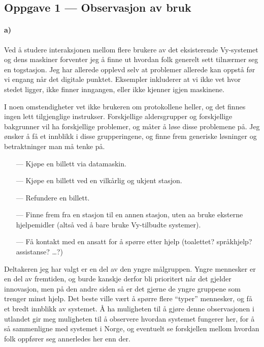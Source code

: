 \documentclass{../../myassignment}
\begin{document}
	\subsection*{Oppgave 1 --- Observasjon av bruk}
	\paragraph*{a)}

		Ved {\aa} studere interaksjonen mellom flere brukere av det eksisterende Vy-systemet og dens maskiner forventer jeg {\aa} finne ut hvordan folk generelt sett tiln{\ae}rmer seg en togstasjon. Jeg har allerede opplevd selv at problemer allerede kan oppst{\aa} f{\o}r vi engang n{\aa}r det digitale punktet. Eksempler inkluderer at vi ikke vet hvor stedet ligger, ikke finner inngangen, eller ikke kjenner igjen maskinene. 

		I noen omstendigheter vet ikke brukeren om protokollene heller, og det finnes ingen lett tilgjenglige instrukser. Forskjellige aldersgrupper og forskjellige bakgrunner vil ha forskjellige problemer, og m{\aa}ter {\aa} l{\o}se disse problemene p{\aa}. Jeg {\o}nsker {\aa} f{\aa} et innblikk i disse grupperingene, og finne frem generiske l{\o}sninger og betraktninger man m{\aa} tenke p{\aa}.

		\begin{itemize}
		\item[---] Kj{\o}pe en billett via datamaskin. 
		\item[---] Kj{\o}pe en billett ved en vilk{\aa}rlig og ukjent stasjon. 
		\item[---] Refundere en billett.
		\item[---] Finne frem fra en stasjon til en annen stasjon, uten aa bruke eksterne hjelpemidler (alts{\aa} ved {\aa} bare bruke Vy-tilbudte systemer). 
		\item[---] F{\aa} kontakt med en ansatt for {\aa} sp{\o}rre etter hjelp (toalettet? spr{\aa}khjelp? assistanse? {\dots}?)
		\end{itemize}


		Deltakeren jeg har valgt er en del av den yngre m{\aa}lgruppen. Yngre mennesker er en del av fremtiden, og burde kanskje derfor bli prioritert n{\aa}r det gjelder innovasjon, men p{\aa} den andre siden s{\aa} er det gjerne de yngre gruppene som trenger minst hjelp. Det beste ville v{\ae}rt {\aa} sp{\o}rre flere ``typer'' mennesker, og f{\aa} et bredt innblikk av systemet. {\AA} ha muligheten til {\aa} gj{\o}re denne observasjonen i utlandet gir meg muligheten til {\aa} observere hvordan systemet fungerer her, for {\aa} s{\aa} sammenligne med systemet i Norge, og eventuelt se forskjellen mellom hvordan folk oppf{\o}rer seg annerledes her enn der.
\end{document}
